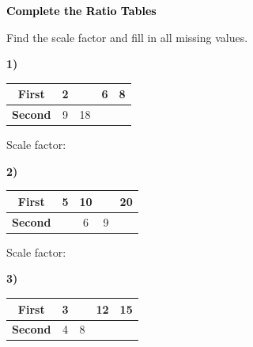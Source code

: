 \documentclass[12pt, letterpaper, fleqn]{article}
\newcommand{\blankshorter}{\underline{\hspace{1.5cm}}}
\begin{document}
\newpage

\begin{tcolorbox}[colback=customteal!20]
\large\textcolor{black}{\textbf{Complete the Ratio Tables}}
\end{tcolorbox}

\vspace{0.5cm}

\noindent
Find the scale factor and fill in all missing values.

\vspace{1.5cm}

\noindent
\textbf{1)}

\begin{center}
\begin{tabular}{|c|c|c|c|c|}
\hline
\textbf{First} & 2 & \phantom{00} & 6 & 8 \\
\hline
\textbf{Second} & 9 & 18 & \phantom{00} & \phantom{00} \\
\hline
\end{tabular}
\end{center}

\vspace{2mm}


\noindent
Scale factor: \blankshorter

\vspace{2cm}


\noindent
\textbf{2)}

\begin{center}
\begin{tabular}{|c|c|c|c|c|}
\hline
\textbf{First} & 5 & 10 & \phantom{00} & 20 \\
\hline
\textbf{Second} & \phantom{00} & 6 & 9 & \phantom{00} \\
\hline
\end{tabular}
\end{center}

\vspace{2mm}

\noindent
Scale factor: \blankshorter

\vspace{2cm}


\noindent
\textbf{3)}

\begin{center}
\begin{tabular}{|c|c|c|c|c|}
\hline
\textbf{First} & 3 & \phantom{00} & 12 & 15 \\
\hline
\textbf{Second} & 4 & 8 & \phantom{00} & \phantom{00} \\
\hline
\end{tabular}
\end{center}
\end{document}
